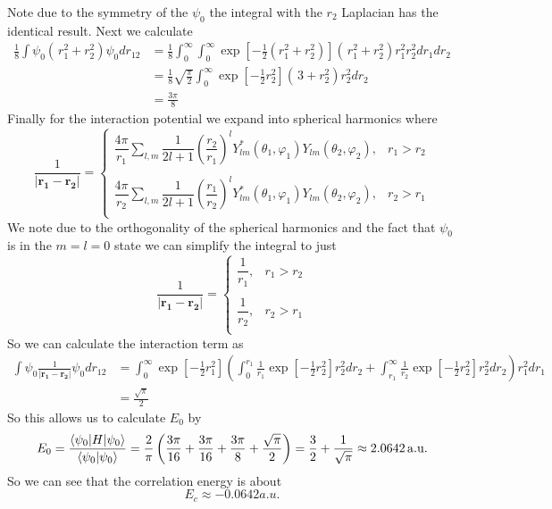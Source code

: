 \documentclass[11pt]{article}
\numberwithin{equation}{section}
\begin{document}
Note due to the symmetry of the $\psi_0$ the integral with the $r_2$ Laplacian has the identical 
result.  Next we calculate 
\begin{align*}
\frac{1}{8}\int\psi_0\left(\frac{}{}r_1^2+r_2^2\right)\psi_0dr_{12} &= \frac{1}{8}\int_{0}^{\infty}\int_{0}^{\infty}\exp\left[-\frac{1}{2}(r_1^2+r_2^2)\right]\left(\frac{}{}r_1^2+r_2^2\right)r_1^2r_2^2dr_1dr_2\\
&= \frac{1}{8}\sqrt{\frac{\pi}{2}}\int_{0}^{\infty}\exp\left[-\frac{1}{2}r_2^2\right]\left(\frac{}{}3+r_2^2\right)r_2^2dr_2\\
&= \frac{3\pi}{8}
\end{align*}
Finally for the interaction potential we expand into spherical harmonics where
$$\frac{1}{|\mathbf{r_1}-\mathbf{r_2}|} = \left\{\begin{array}{cc}
\dfrac{4\pi}{r_1}\sum_{l,m}\dfrac{1}{2l+1}\left(\dfrac{r_2}{r_1}\right)^{l}Y^*_{lm}(\theta_1,\varphi_1)Y_{lm}(\theta_2,\varphi_2),   &r_1>r_2\\
\\
\dfrac{4\pi}{r_2}\sum_{l,m}\dfrac{1}{2l+1}\left(\dfrac{r_1}{r_2}\right)^{l}Y^*_{lm}(\theta_1,\varphi_1)Y_{lm}(\theta_2,\varphi_2),   &r_2>r_1\\
\end{array}\right.$$
We note due to the orthogonality of the spherical harmonics and the fact that $\psi_0$ is in
the $m=l=0$ state we can simplify the integral to just 
$$\frac{1}{|\mathbf{r_1}-\mathbf{r_2}|} = \left\{\begin{array}{cc}
\dfrac{1}{r_1}, &r_1>r_2\\
\\
\dfrac{1}{r_2}, &r_2>r_1\\
\end{array}\right.$$
So we can calculate the interaction term as
\begin{align*}
\int\psi_0\frac{1}{|\mathbf{r_1}-\mathbf{r_2}|}\psi_0dr_{12}
&= \int_{0}^{\infty}\exp\left[-\frac{1}{2}r_1^2\right]\left(\int_{0}^{r_1}\frac{1}{r_1}\exp\left[-\frac{1}{2}r_2^2\right]r_2^2dr_2 + \int_{r_1}^{\infty}\frac{1}{r_2}\exp\left[-\frac{1}{2}r_2^2\right]r_2^2dr_2\right)r_1^2dr_1\\
&= \frac{\sqrt{\pi}}{2}
\end{align*}
So this allows us to calculate $E_0$ by
$$E_0 = \frac{\langle{\psi_0}|H|{\psi_0}\rangle}{\langle{\psi_0}|{\psi_0}\rangle} = \frac{2}{\pi}\left(\frac{3\pi}{16} + \frac{3\pi}{16} + \frac{3\pi}{8} + \frac{\sqrt{\pi}}{2}\right) = \frac{3}{2}+\frac{1}{\sqrt{\pi}}\approx2.0642\, \mathrm{a.u.}$$
So we can see that the correlation energy is about
$$E_c\approx-0.0642\unit{a.u.}$$
\end{document}
